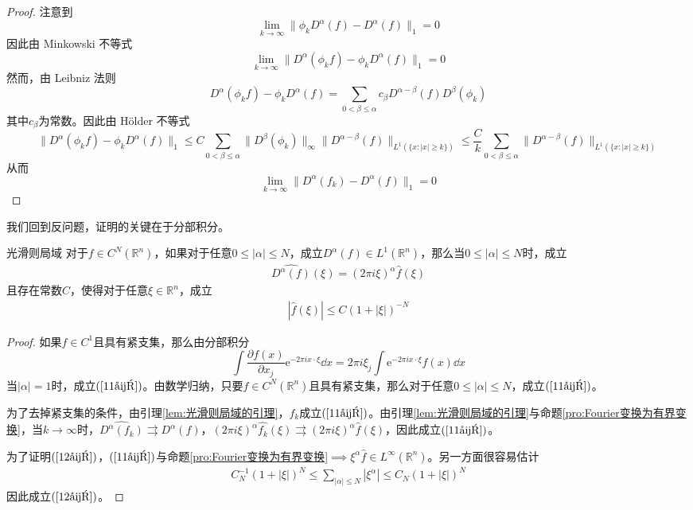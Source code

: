 \documentclass[lang = cn, %
scheme = chinese          %
]
{elegantbook}             %
\newcommand{\R}{\mathbb{R}}            %
\newcommand{\ee}[1]{\mathrm{e}^{#1}}           %
\begin{document}
\begin{proof}
	注意到
	\[
	\lim_{k\to\infty}\|\phi_kD^\alpha(f)-D^\alpha(f)\|_1=0
	\]
	因此由 Minkowski 不等式
	\[
	\lim_{k\to\infty}\|D^\alpha(\phi_kf)-\phi_kD^\alpha(f)\|_1=0
	\]
	然而，由 Leibniz 法则
	\[
	D^\alpha(\phi_kf)-\phi_kD^\alpha(f)
	=\sum_{0<\beta\le \alpha}c_{\beta}D^{\alpha-\beta}(f)D^\beta(\phi_k)
	\]
	其中$c_\beta$为常数。因此由 Hölder 不等式
	\[
	\|D^\alpha(\phi_kf)-\phi_kD^\alpha(f)\|_1
	\le C\sum_{0<\beta\le \alpha}\|D^\beta(\phi_k)\|_{\infty}\|D^{\alpha-\beta}(f)\|_{L^1(\{ x:|x|\ge k \})}
	\le \frac{C}{k}\sum_{0<\beta\le \alpha}\|D^{\alpha-\beta}(f)\|_{L^1(\{ x:|x|\ge k \})}
	\]
	从而
	\[
	\lim_{k\to\infty}\|D^\alpha(f_k)-D^\alpha(f)\|_1=0
	\]
\end{proof}

我们回到反问题，证明的关键在于分部积分。

\begin{proposition}{}{光滑则局域}
	对于$f\in C^N(\R^n)$，如果对于任意$0\le |\alpha| \le N$，成立$D^\alpha(f)\in L^1(\R^n)$，那么当$0\le |\alpha| \le N$时，成立
	\begin{gather}
		\label{11式}
		\widehat{D^\alpha(f)}(\xi)
		=(2\pi i \xi)^{\alpha}\widehat{f}(\xi)
	\end{gather}
	且存在常数$C$，使得对于任意$\xi\in\R^n$，成立
	\begin{gather}
		\label{12式}
		|\widehat{f}(\xi)|
		\le C(1+|\xi|)^{-N}
	\end{gather}
\end{proposition}

\begin{proof}
	如果$f\in C^1$且具有紧支集，那么由分部积分
	\[
	\int \frac{\partial f(x)}{\partial x_j}\ee{-2\pi i x\cdot \xi}\dd x
	=2\pi i \xi_j \int \ee{-2\pi i x\cdot \xi}f(x)\dd x
	\]
	当$|\alpha|=1$时，成立$(\ref{11式})$。由数学归纳，只要$f\in C^N(\R^n)$且具有紧支集，那么对于任意$0\le |\alpha| \le N$，成立$(\ref{11式})$。
	
	为了去掉紧支集的条件，由引理\ref{lem:光滑则局域的引理}，$f_k$成立$(\ref{11式})$。由引理\ref{lem:光滑则局域的引理}与命题\ref{pro:Fourier变换为有界变换}，当$k\to\infty$时，$\widehat{D^\alpha(f_k)}\rightrightarrows D^\alpha(f)$，$(2\pi i \xi)^{\alpha}\widehat{f_k}(\xi)\rightrightarrows (2\pi i \xi)^{\alpha}\widehat{f}(\xi)$，因此成立$(\ref{11式})$。
	
	为了证明$(\ref{12式})$，$(\ref{11式})$与命题\ref{pro:Fourier变换为有界变换}$\implies \xi^\alpha\widehat{f}\in L^\infty(\R^n)$。另一方面很容易估计
	\begin{gather}
		\label{14式}
		C_N^{-1}(1+|\xi|)^N
		\le \sum_{|\alpha|\le N}|\xi^\alpha|
		\le C_N(1+|\xi|)^N
	\end{gather}
	因此成立$(\ref{12式})$。
\end{proof}
\end{document}
